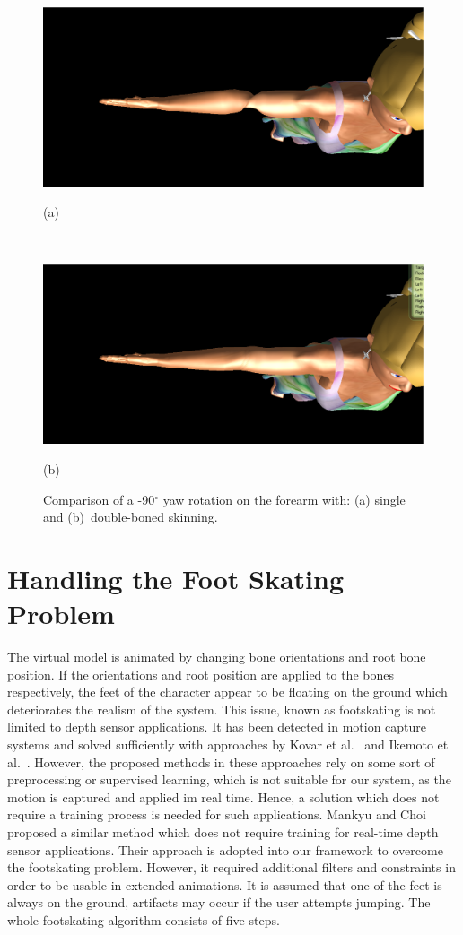 \begin{figure}[htbp]
	\centerline{\includegraphics[width=1.0\columnwidth]{./figures/fore-arm-single-bone.eps}}
	\centerline{(a)}
	\centerline{\ }
	\centerline{\includegraphics[width=1.0\columnwidth]{./figures/fore-arm-double-bone.eps}}
	\centerline{(b)}
	\caption{Comparison of a -90$^\circ$ yaw rotation on the forearm with: (a) single and (b)~double-boned skinning.}
	\label{fig:forearm-comparison}
\end{figure}

\section{Handling the Foot Skating Problem}
\label{section_foot_skating}
The virtual model is animated by changing bone orientations and root bone position. If the orientations and root position are applied to the bones respectively, the feet of the character appear to be floating on the ground which deteriorates the realism of the system. 
This issue, known as footskating is not limited to depth sensor applications. It has been detected in motion capture systems and solved sufficiently with approaches by Kovar et al.~\cite{Kovar2002} and Ikemoto et al.~\cite{Ikemoto2006}. However, the proposed methods in these approaches rely on some sort of preprocessing or supervised learning, which is not suitable for our system, as the motion is captured and applied im real time. Hence, a solution which does not require a training process is needed for such applications. Mankyu and Choi~\cite{Mankyu2013} proposed a similar method which does not require training for real-time depth sensor applications. Their approach is adopted into our framework to overcome the footskating problem. However, it required additional filters and constraints in order to be usable in extended animations. It is assumed that one of the feet is always on the ground, artifacts may occur if the user attempts jumping. The whole footskating algorithm consists of five steps. 


